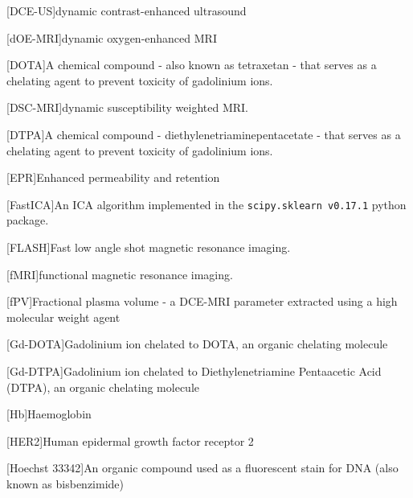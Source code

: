 \begin{acronym}
[DCE-US]{dynamic contrast-enhanced ultrasound}%

[dOE-MRI]{dynamic oxygen-enhanced MRI}%

[DOTA]{A chemical compound - also known as tetraxetan - that serves as a chelating agent to prevent toxicity of gadolinium ions.}

[DSC-MRI]{dynamic susceptibility weighted MRI.}

[DTPA]{A chemical compound - diethylenetriaminepentacetate - that serves as a chelating agent to prevent toxicity of gadolinium ions.}

[EPR]{Enhanced permeability and retention}%

[FastICA]{An ICA algorithm implemented in the \texttt{scipy.sklearn v0.17.1} python package.}

[FLASH]{Fast low angle shot magnetic resonance imaging.}

[fMRI]{functional magnetic resonance imaging.}

[fPV]{Fractional plasma volume - a DCE-MRI parameter extracted using a high molecular weight agent}

[Gd-DOTA]{Gadolinium ion chelated to DOTA, an organic chelating molecule}

[Gd-DTPA]{Gadolinium ion chelated to Diethylenetriamine Pentaacetic Acid (DTPA), an organic chelating molecule}%

[Hb]{Haemoglobin}

[HER2]{Human epidermal growth factor receptor 2}

[Hoechst 33342]{An organic compound used as a fluorescent stain for DNA (also known as bisbenzimide)}


\end{acronym}
